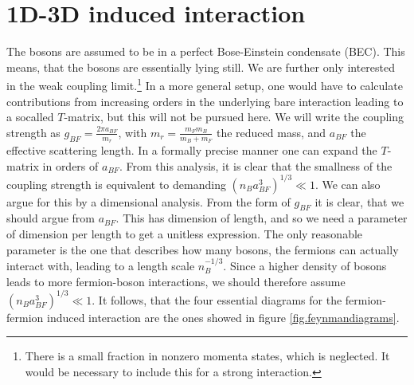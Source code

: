 \section{1D-3D induced interaction}
The bosons are assumed to be in a perfect Bose-Einstein condensate (BEC). This means, that the bosons are essentially lying still. We are further only interested in the weak coupling limit.\footnote{There is a small fraction in nonzero momenta states, which is neglected. It would be necessary to include this for a strong interaction.} In a more general setup, one would have to calculate contributions from increasing orders in the underlying bare interaction leading to a socalled $T$-matrix, but this will not be pursued here. We will write the coupling strength as $g_{BF} = \frac{2\pi a_{BF}}{m_r}$, with $m_r = \frac{m_Fm_B}{m_B + m_F}$ the reduced mass, and $a_{BF}$ the effective scattering length. In a formally precise manner one can expand the $T$-matrix in orders of $a_{BF}$. From this analysis, it is clear that the smallness of the coupling strength is equivalent to demanding $(n_Ba_{BF}^3)^{1/3}\ll 1$. We can also argue for this by a dimensional analysis. From the form of $g_{BF}$ it is clear, that we should argue from $a_{BF}$. This has dimension of length, and so we need a parameter of dimension per length to get a unitless expression. The only reasonable parameter is the one that describes how many bosons, the fermions can actually interact with, leading to a length scale $n_B^{-1/3}$. Since a higher density of bosons leads to more fermion-boson interactions, we should therefore assume $(n_Ba_{BF}^3)^{1/3} \ll 1$. It follows, that the four essential diagrams for the fermion-fermion induced interaction are the ones showed in figure \ref{fig.feynmandiagrams}. 

